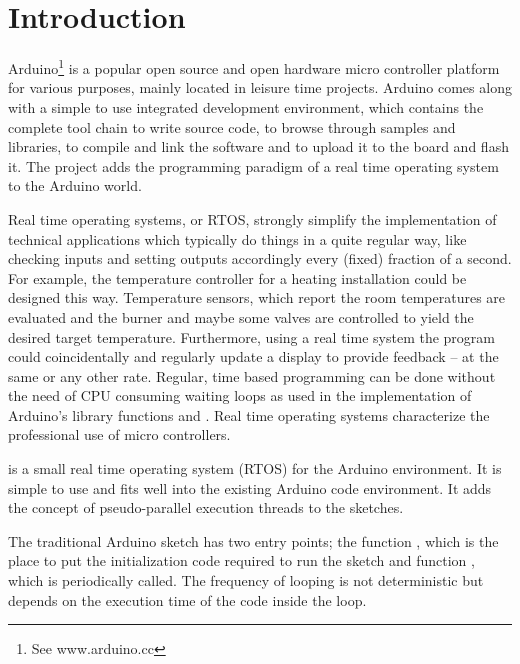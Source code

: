 \chapter{Introduction}
\label{secInrto}

Arduino\footnote{See www.arduino.cc} is a popular open source and open
hardware micro controller platform for various purposes, mainly located in leisure
time projects. Arduino comes along with a simple to use integrated
development en\-vi\-ron\-ment, which contains the complete tool chain to
write source code, to browse through samples and libraries, to compile and
link the software and to upload it to the board and flash it. The
\rtos{} project adds the programming paradigm of a real time operating
system to the Arduino world.

Real time operating systems, or RTOS, strongly simplify the implementation
of technical applications which typically do things in a quite regular
way, like checking inputs and setting outputs accordingly every (fixed)
fraction of a second. For example, the temperature controller for a
heating installation could be designed this way. Temperature sensors,
which report the room temperatures are evaluated and the burner and maybe
some valves are controlled to yield the desired target temperature.
Furthermore, using a real time system the program could coincidentally and
regularly update a display to provide feedback -- at the same or any other
rate. Regular, time based programming can be done without the need of CPU
consuming waiting loops as used in the implementation of Arduino's library
functions  and . Real time operating
systems characterize the professional use of micro controllers.

\rtos{} is a small real time operating system (RTOS) for the Arduino
environment. It is simple to use and fits well into the existing Arduino
code environment. It adds the concept of pseudo-parallel execution threads
to the sketches.

The traditional Arduino sketch has two entry points; the function
, which is the place to put the initialization code required
to run the sketch and function , which is periodically
called. The frequency of looping is not deterministic but depends on
the execution time of the code inside the loop.


